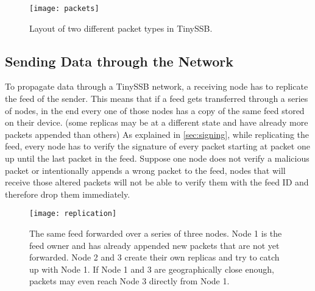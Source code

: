 \begin{figure}
\centering
\texttt{[image: packets]}
\caption{Layout of two different packet types in TinySSB.}
\label{fig:packets}
\end{figure}

\subsection{Sending Data through the Network}
\label{sec:sending}
To propagate data through a TinySSB network, a receiving node has to replicate the feed of the sender. This means that if a feed gets transferred through a series of nodes, in the end every one of those nodes has a copy of the same feed stored on their device. (some replicas may be at a different state and have already more packets appended than others) As explained in \cref{sec:signing}, while replicating the feed, every node has to verify the signature of every packet starting at packet one up until the last packet in the feed. Suppose one node does not verify a malicious packet or intentionally appends a wrong packet to the feed, nodes that will receive those altered packets will not be able to verify them with the feed ID and therefore drop them immediately.

\begin{figure}
\centering
\texttt{[image: replication]}
\caption{The same feed forwarded over a series of three nodes. Node 1 is the feed owner and has already appended new packets that are not yet forwarded. Node 2 and 3 create their own replicas and try to catch up with Node 1. If Node 1 and 3 are geographically close enough, packets may even reach Node 3 directly from Node 1.}
\label{fig:replication}
\end{figure}

